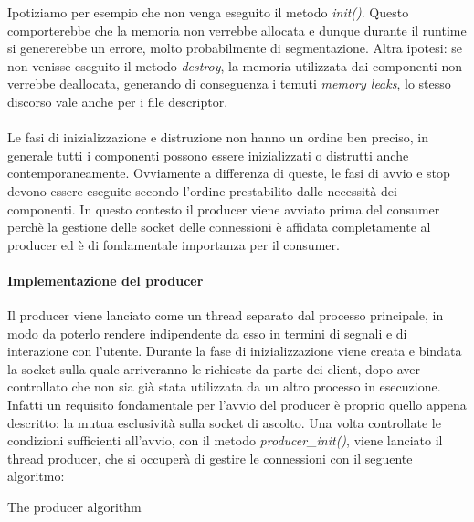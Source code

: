 \documentclass[]{article}
\begin{document}
Ipotiziamo per esempio che non venga eseguito il metodo \textit{init()}.
Questo comporterebbe che la memoria non verrebbe allocata 
e dunque durante il runtime si genererebbe un errore, molto probabilmente
di segmentazione.
Altra ipotesi: se non venisse eseguito il metodo \textit{destroy},
la memoria utilizzata dai componenti non verrebbe deallocata,
generando di conseguenza i temuti \textit{memory leaks}, lo stesso discorso
vale anche per i file descriptor.
\\
\\
Le fasi di inizializzazione e distruzione non hanno un ordine ben preciso,
in generale tutti i componenti possono essere inizializzati o distrutti
anche contemporaneamente. Ovviamente a differenza di queste, le fasi
di avvio e stop devono essere eseguite secondo l'ordine prestabilito
dalle necessit\`a dei componenti.
In questo contesto il producer viene avviato prima del consumer perch\`e
la gestione delle socket delle connessioni \`e affidata completamente al
producer ed \`e di fondamentale importanza per il consumer.

\paragraph{Implementazione del producer}
Il producer viene lanciato come un thread separato dal processo principale,
in modo da poterlo rendere indipendente da esso in termini di segnali e di interazione con l'utente.
Durante la fase di inizializzazione viene creata e bindata la socket sulla quale
arriveranno le richieste da parte dei client, dopo aver controllato che non sia gi\`a stata
utilizzata da un altro processo in esecuzione.
Infatti un requisito fondamentale per l'avvio del producer \`e proprio quello appena descritto: la mutua esclusivit\`a sulla socket di ascolto.
Una volta controllate le condizioni sufficienti all'avvio, con il  metodo \textit{producer\_init()}, viene lanciato il thread producer,
che si occuper\`a di gestire le connessioni con il seguente algoritmo:

\begin{algorithm}[H] 
	\caption{The producer algorithm}
\end{algorithm}
\end{document}
